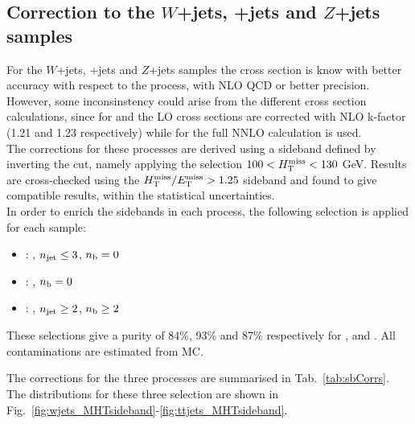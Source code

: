 \subsection{Correction to the $W$+jets, \ttbar+jets and $Z$+jets samples}
\label{sec:sideband_corrections_w_z_tt}
For the $W$+jets, \ttbar+jets and $Z$+jets samples the cross section is know with better accuracy with respect to the \gj process, 
with NLO QCD or better precision.
However, some inconsinstency could arise from the different cross section calculations, since for \wj and \zj the LO cross sections 
are corrected with NLO k-factor (1.21 and 1.23 respectively) while for \ttbar the full NNLO calculation is used. \\
The corrections for these processes are derived using a sideband defined by inverting the \mht cut, namely 
applying the selection $100 < \mht < 130$ GeV. 
Results are cross-checked using the $\mhtmet > 1.25$ sideband and found to give compatible results, within the statistical uncertainties. \\
In order to enrich the sidebands in each process, the following selection is applied for each sample:
\begin{itemize}
\item \wj: \mj, $\nj \leq 3$, $\nb = 0$
\item \zj: \mmj, $\nb = 0$
\item \ttj: \mj, $\nj \geq 2$, $\nb \geq 2$
\end{itemize}
These selections give a purity of 84\%, 93\% and 87\% respectively for \wj, \zj and \ttj. All contaminations are estimated from MC.

The corrections for the three processes are summarised in Tab.~\ref{tab:sbCorrs}.
The \mht distributions for these three selection are shown in Fig.~\ref{fig:wjets_MHTsideband}-\ref{fig:ttjets_MHTsideband}. \\

